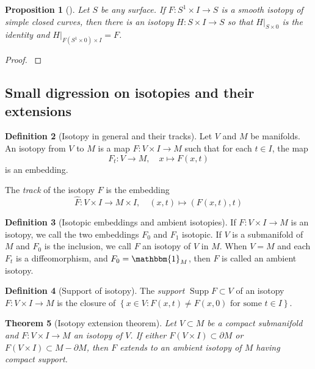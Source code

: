 \documentclass[reqno]{amsart}
\newtheorem{theorem}{Theorem}[section]
\newtheorem{proposition}[theorem]{Proposition}
\theoremstyle{definition}
\newtheorem{definition}[theorem]{Definition}
\theoremstyle{remark}
\DeclareMathOperator{\Supp}{Supp}
\begin{document}
\begin{proposition}[]
    Let $S$ be any surface. If $F \colon S^{1} \times I \to 
    S$ is a smooth isotopy of simple closed curves, then
    there is an isotopy $H \colon S \times I \to S$ so that
    $H |_{S \times 0}$ is the identity and 
    $H|_{F\left( S^{1} \times 0 \right) \times I} = F$.
\end{proposition}

\begin{proof}
    \cite[Ch~8, Thm 1.3]{Hirsch}
\end{proof}

\subsection{Small digression on isotopies and their extensions}

\begin{definition}[Isotopy in general and their tracks]
    Let $V$ and $M$ be manifolds. An
    isotopy from $V$ to $M$ is a map
    $F \colon V \times I \to M$ such that
    for each $t \in I$, the map
    \[
    F_t \colon V \to M, \quad x \mapsto F(x,t)
    \] 
    is an embedding.

    The \textit{track} of the isotopy $F$ is the embedding
    \[
    \hat{F} \colon V \times I \to M \times I, \quad
    \left( x,t \right) \mapsto \left( F(x,t),t \right) 
    \] 
\end{definition}

\begin{definition}[Isotopic embeddings and ambient isotopies]
    If $F \colon V \times I \to M$ is an isotopy, we call
    the two embeddings $F_0$ and $F_1$ 
    isotopic. If $V$ is a submanifold of $M$ and
    $F_0$ is the inclusion, we call $F$ an isotopy
    of $V$ in $M$.
    When $V = M$ and each $F_t$ is a diffeomorphism, and
    $F_0 = \mathbbm{1}_M$, then $F$ is called
    an ambient isotopy.
\end{definition}

\begin{definition}[Support of isotopy]
    The \textit{support} $\Supp F
    \subset V $ of an isotopy $F \colon V \times I \to M$ 
    is the closure of
    $\left\{ x \in V \colon
    F(x,t) \neq F(x,0) \text{ for some }
t \in I\right\} $.
\end{definition}


\begin{theorem}[Isotopy extension theorem]\label{isotopy-extension}
    \cite[Theorem 1.3, chapter 8]{Hirsch}
    Let $V \subset M$ be a compact submanifold
    and $F \colon V \times I \to M$ an isotopy
    of $V$. If either $F\left( V \times I \right) 
    \subset \partial M$ or $F\left( V \times I \right) 
    \subset M - \partial M$, then $F$ extends to
    an ambient isotopy of $M$ having compact support.
\end{theorem}
\end{document}
